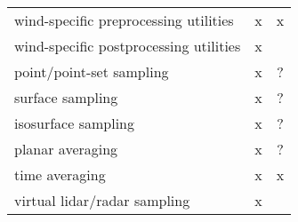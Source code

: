 \documentclass{article}
\begin{document}
\begin{center}
\begin{tabular}{ l | c | c }
\midrule
wind-specific preprocessing utilities & x & x \\
wind-specific postprocessing utilities & x &   \\
point/point-set sampling & x & ? \\
surface sampling & x & ? \\
isosurface sampling & x & ? \\
planar averaging & x & ? \\
time averaging & x & x \\
virtual lidar/radar sampling & x &   \\




\bottomrule
\end{tabular}
\end{center}


\end{document}
